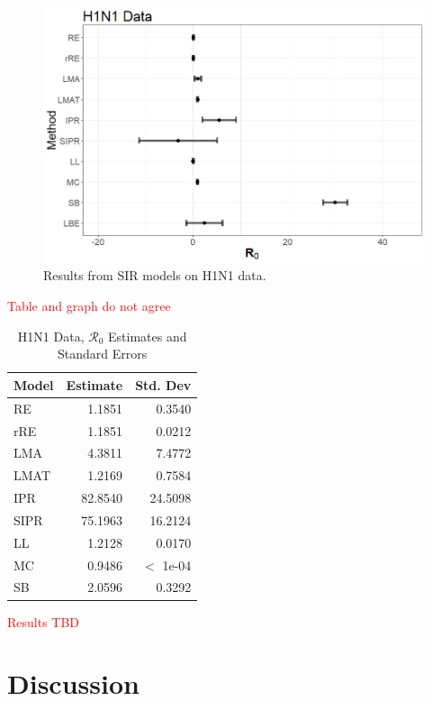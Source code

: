 \documentclass[12pt]{article}
\newcommand{\com}[1]{\textcolor{red}{ #1}}
\newcommand{\rr}{\ensuremath{\mathcal{R}_0}}
\begin{document}
\begin{figure}[H]
	\centering
	\includegraphics[width=\textwidth]{images/h1n1.jpg}
	\caption{Results from SIR models on H1N1 data.}
\end{figure}

\com{Table and graph do not agree}
\begin{table}[H]
	
	
	\centering
	\begin{tabular}{l|r|r}
		\hline
		Model & Estimate & Std. Dev\\
		\hline
		RE & 1.1851 & 0.3540\\
		\hline
		rRE & 1.1851 & 0.0212\\
		\hline
		LMA & 4.3811 & 7.4772\\
		\hline
		LMAT & 1.2169 & 0.7584\\
		\hline
		IPR & 82.8540 & 24.5098\\
		\hline
		SIPR & 75.1963 & 16.2124\\
		\hline
		LL & 1.2128 & 0.0170\\
		\hline
		MC & 0.9486 & $<$ 1e-04 \\
		\hline
		SB & 2.0596 & 0.3292\\
		\hline
	\end{tabular}
	\caption{H1N1 Data, $\rr$ Estimates and Standard Errors}
\end{table}

\com{Results TBD}

      
\section{Discussion}\label{sec:discussion}
\end{document}
